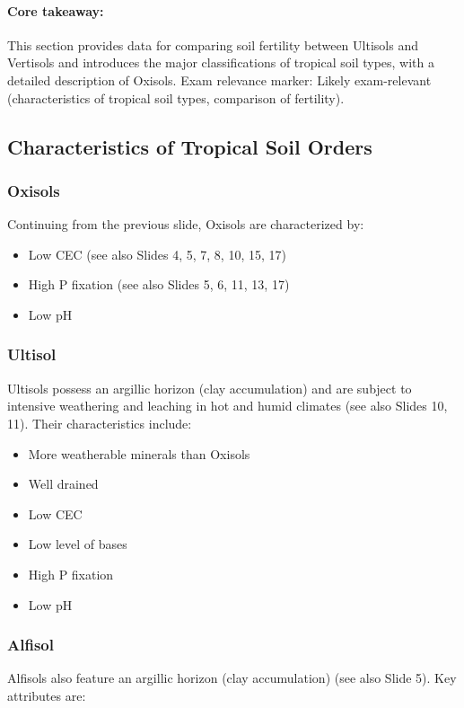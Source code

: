 \paragraph*{Core takeaway:} 
This section provides data for comparing soil fertility between Ultisols and Vertisols and introduces the major classifications of tropical soil types, with a detailed description of Oxisols. Exam relevance marker: Likely exam-relevant (characteristics of tropical soil types, comparison of fertility).

\subsection{Characteristics of Tropical Soil Orders} \subsubsection*{Oxisols} Continuing from the previous slide, Oxisols are characterized by: 

\begin{itemize} 
    \item Low CEC (see also Slides 4, 5, 7, 8, 10, 15, 17)
    \item High P fixation (see also Slides 5, 6, 11, 13, 17)
    \item Low pH 
\end{itemize}

\subsubsection*{Ultisol} Ultisols possess an argillic horizon (clay accumulation) and are subject to intensive weathering and leaching in hot and humid climates (see also Slides 10, 11). Their characteristics include: 

\begin{itemize} 
    \item More weatherable minerals than Oxisols 
    \item Well drained 
    \item Low CEC 
    \item Low level of bases 
    \item High P fixation 
    \item Low pH 
\end{itemize}

\subsubsection*{Alfisol} 
Alfisols also feature an argillic horizon (clay accumulation) (see also Slide 5). Key attributes are: 

